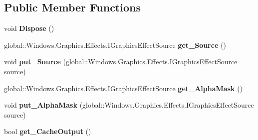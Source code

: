 \subsection*{Public Member Functions}
\begin{DoxyCompactItemize}
\item 
\mbox{\label{class_microsoft_1_1_graphics_1_1_canvas_1_1_effects_1_1_alpha_mask_effect_ad440adc90c2c781ab55ade969e5f1d4e}} 
void {\bfseries Dispose} ()
\item 
\mbox{\label{class_microsoft_1_1_graphics_1_1_canvas_1_1_effects_1_1_alpha_mask_effect_a8d116ff3511cd0f94376c742892e704d}} 
global\+::\+Windows.\+Graphics.\+Effects.\+I\+Graphics\+Effect\+Source {\bfseries get\+\_\+\+Source} ()
\item 
\mbox{\label{class_microsoft_1_1_graphics_1_1_canvas_1_1_effects_1_1_alpha_mask_effect_abf6bc1fce01955fd8230cfbdbc60dfb5}} 
void {\bfseries put\+\_\+\+Source} (global\+::\+Windows.\+Graphics.\+Effects.\+I\+Graphics\+Effect\+Source source)
\item 
\mbox{\label{class_microsoft_1_1_graphics_1_1_canvas_1_1_effects_1_1_alpha_mask_effect_a792ae5ec633c37855297ce56bca05ca7}} 
global\+::\+Windows.\+Graphics.\+Effects.\+I\+Graphics\+Effect\+Source {\bfseries get\+\_\+\+Alpha\+Mask} ()
\item 
\mbox{\label{class_microsoft_1_1_graphics_1_1_canvas_1_1_effects_1_1_alpha_mask_effect_afd9b551a7df57ac4fc9bfb2273852158}} 
void {\bfseries put\+\_\+\+Alpha\+Mask} (global\+::\+Windows.\+Graphics.\+Effects.\+I\+Graphics\+Effect\+Source source)
\item 
\mbox{\label{class_microsoft_1_1_graphics_1_1_canvas_1_1_effects_1_1_alpha_mask_effect_a1a8a0b71bf38b0ea9c0cf7aed0b847af}} 
bool {\bfseries get\+\_\+\+Cache\+Output} ()
\item 
\mbox{\label{class_microsoft_1_1_graphics_1_1_canvas_1_1_effects_1_1_alpha_mask_effect_afd836c4380d7c17db8f813b285bc0d7c}} 

\end{DoxyCompactItemize}
